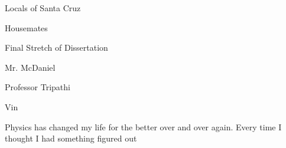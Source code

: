 \label{sec:acknowledgements}




Locals of Santa Cruz

Housemates

Final Stretch of Dissertation

Mr. McDaniel

Professor Tripathi 

Vin


Physics has changed my life for the better over and over again.  Every time I
thought I had something figured out
